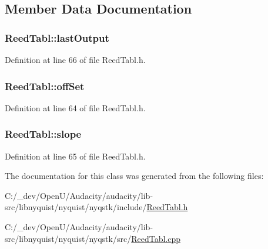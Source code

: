 \subsection{Member Data Documentation}
\subsubsection[{\texorpdfstring{last\+Output}{lastOutput}}]{ Reed\+Tabl\+::last\+Output\hspace{0.3cm}{\ttfamily [protected]}}\hypertarget{class_reed_tabl_a2fca6697bed8ad35d73b0853fb156df7}{}\label{class_reed_tabl_a2fca6697bed8ad35d73b0853fb156df7}


Definition at line 66 of file Reed\+Tabl.\+h.

\subsubsection[{\texorpdfstring{off\+Set}{offSet}}]{ Reed\+Tabl\+::off\+Set\hspace{0.3cm}{\ttfamily [protected]}}\hypertarget{class_reed_tabl_ad018e3b63358533ab9e0b8c601970390}{}\label{class_reed_tabl_ad018e3b63358533ab9e0b8c601970390}


Definition at line 64 of file Reed\+Tabl.\+h.

\subsubsection[{\texorpdfstring{slope}{slope}}]{ Reed\+Tabl\+::slope\hspace{0.3cm}{\ttfamily [protected]}}\hypertarget{class_reed_tabl_a4db040d7d8bc677e43e27cc1260422d1}{}\label{class_reed_tabl_a4db040d7d8bc677e43e27cc1260422d1}


Definition at line 65 of file Reed\+Tabl.\+h.



The documentation for this class was generated from the following files\+:\begin{DoxyCompactItemize}
\item 
C\+:/\+\_\+dev/\+Open\+U/\+Audacity/audacity/lib-\/src/libnyquist/nyquist/nyqstk/include/\hyperlink{_reed_tabl_8h}{Reed\+Tabl.\+h}\item 
C\+:/\+\_\+dev/\+Open\+U/\+Audacity/audacity/lib-\/src/libnyquist/nyquist/nyqstk/src/\hyperlink{_reed_tabl_8cpp}{Reed\+Tabl.\+cpp}\end{DoxyCompactItemize}
